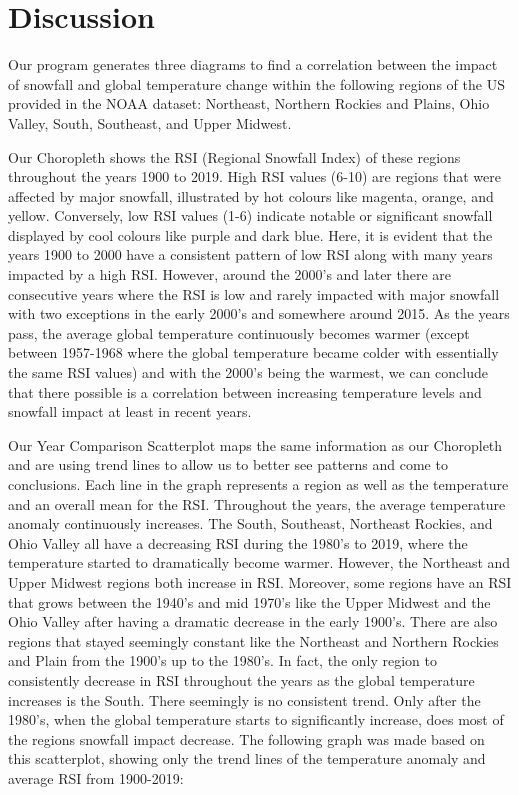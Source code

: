 \documentclass[fontsize=11pt]{article}
\begin{document}
\section*{Discussion}
Our program generates three diagrams to find a correlation between the impact of snowfall and global temperature change within the following regions of the US provided in the NOAA dataset: Northeast, Northern Rockies and Plains, Ohio Valley, South, Southeast, and Upper Midwest.

Our Choropleth shows the RSI (Regional Snowfall Index) of these regions throughout the years 1900 to 2019. High RSI values (6-10) are regions that were affected by major snowfall, illustrated by hot colours like magenta, orange, and yellow. Conversely, low RSI values (1-6) indicate notable or significant snowfall displayed by cool colours like purple and dark blue. Here, it is evident that the years 1900 to 2000 have a consistent pattern of low RSI along with many years impacted by a high RSI. However, around the 2000’s and later there are consecutive years where the RSI is low and rarely impacted with major snowfall with two exceptions in the early 2000’s and somewhere around 2015. As the years pass, the average global temperature continuously becomes warmer (except between 1957-1968 where the global temperature became colder with essentially the same RSI values) and with the 2000’s being the warmest, we can conclude that there possible is a correlation between increasing temperature levels and snowfall impact at least in recent years. 

Our Year Comparison Scatterplot maps the same information as our Choropleth and are using trend lines to allow us to better see patterns and come to conclusions. Each line in the graph represents a region as well as the temperature and an overall mean for the RSI. Throughout the years, the average temperature anomaly continuously increases. The South, Southeast, Northeast Rockies, and Ohio Valley all have a decreasing RSI during the 1980’s to 2019, where the temperature started to dramatically become warmer. However, the Northeast and Upper Midwest regions both increase in RSI. Moreover, some regions have an RSI that grows between the 1940’s and mid 1970’s like the Upper Midwest and the Ohio Valley after having a dramatic decrease in the early 1900’s. There are also regions that stayed seemingly constant like the Northeast and Northern Rockies and Plain from the 1900’s up to the 1980’s. In fact, the only region to consistently decrease in RSI throughout the years as the global temperature increases is the South. There seemingly is no consistent trend. Only after the 1980’s, when the global temperature starts to significantly increase, does most of the regions snowfall impact decrease. The following graph was made based on this scatterplot, showing only the trend lines of the temperature anomaly and average RSI from 1900-2019:
\end{document}
